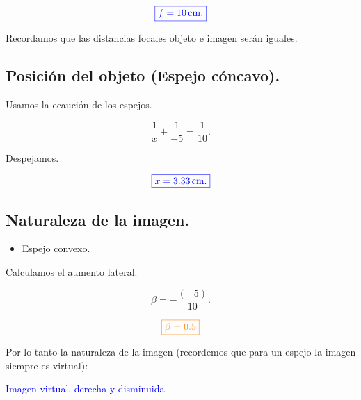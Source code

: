 \documentclass[a4paper,12pt]{article} %
\begin{document}
\vspace{\baselineskip}

\[ \textcolor{blue}{\boxed{f = 10 \, \mathrm{cm}.}} \]

\begin{justify}
	Recordamos que las distancias focales objeto e imagen serán iguales.
\end{justify}

\vspace{\baselineskip}

\subsection{Posición del objeto (Espejo  cóncavo).}

\begin{justify}
	Usamos la ecaución de los espejos.
\end{justify}

\[ \frac{1}{x} + \frac{1}{-5} = \frac{1}{10}. \]

\begin{justify}
	Despejamos.
\end{justify}

\[ \textcolor{blue}{\boxed{x = 3.33 \, \mathrm{cm}.}} \]

\vspace{\baselineskip}

\subsection{Naturaleza de la imagen.}

\begin{itemize}
	\item Espejo convexo.
\end{itemize}

\begin{justify}
	Calculamos el aumento lateral.
\end{justify}

\[ \beta = -\frac{(-5)}{10}. \]

\[ \textcolor{orange}{\boxed{ \beta = 0.5 }}\]

\begin{justify}
	Por lo tanto la naturaleza de la imagen (recordemos que para un espejo la imagen siempre es virtual):
\end{justify}

\begin{justify}
	\centering
	\textcolor{blue}{Imagen virtual, derecha y disminuida.}
\end{justify}
\end{document}
